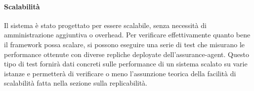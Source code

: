 \paragraph{Scalabilità}
Il sistema è stato progettato per essere scalabile, senza necessità di amministrazione aggiuntiva o overhead.
Per verificare effettivamente quanto bene il framework possa scalare, si possono eseguire una serie di test che misurano le performance ottenute con diverse repliche deployate dell'assurance-agent.
Questo tipo di test fornirà dati concreti sulle performance di un sistema scalato su varie istanze e permetterà di verificare o meno l'assunzione teorica della facilità di scalabilità fatta nella sezione sulla replicabilità.
